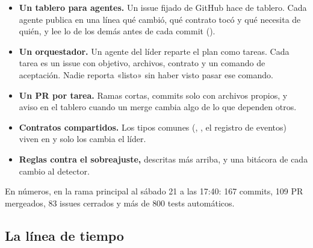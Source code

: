 \begin{itemize}
  \item \textbf{Un tablero para agentes.} Un issue fijado de GitHub hace de tablero. Cada agente
    publica en una línea qué cambió, qué contrato tocó y qué necesita de quién, y lee lo de los demás
    antes de cada commit ().
  \item \textbf{Un orquestador.} Un agente del líder reparte el plan como tareas. Cada tarea es un
    issue con objetivo, archivos, contrato y un comando de aceptación. Nadie reporta «listo» sin haber
    visto pasar ese comando.
  \item \textbf{Un PR por tarea.} Ramas cortas, commits solo con archivos propios, y aviso en el
    tablero cuando un merge cambia algo de lo que dependen otros.
  \item \textbf{Contratos compartidos.} Los tipos comunes (, , el registro
    de eventos) viven en  y solo los cambia el líder.
  \item \textbf{Reglas contra el sobreajuste,} descritas más arriba, y una bitácora de cada cambio al
    detector.
\end{itemize}

En números, en la rama principal al sábado 21 a las 17:40: 167 commits, 109 PR mergeados, 83 issues
cerrados y más de 800 tests automáticos.

\subsection{La línea de tiempo}

